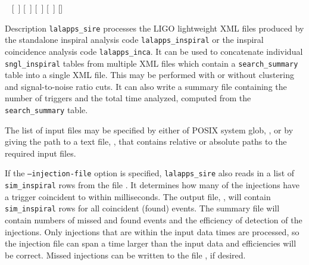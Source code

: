 \begin{entry}
~ \newline \hspace*{0.5in}
  \newline \hspace*{0.5in}
[~] \newline \hspace*{0.5in}
[~] \newline \hspace*{0.5in}
[~] \newline \hspace*{0.5in}
[~] \newline \hspace*{0.5in}
[] \newline \hspace*{0.5in}
 \newline \hspace*{0.5in}


\item[Description] 
\verb$lalapps_sire$ processes the LIGO lightweight XML files produced by the
standalone inspiral analysis code \verb$lalapps_inspiral$ or the inspiral
coincidence analysis code \verb$lalapps_inca$. It can be used to concatenate
individual \verb$sngl_inspiral$ tables from multiple XML files which contain a
\verb$search_summary$ table into a single XML file. This may be performed with
or without clustering and signal-to-noise ratio cuts. It can also write a
summary file containing the number of triggers and the total time analyzed,
computed from the \verb$search_summary$ table.

The list of input files may be specified by either of POSIX system glob,
, or by giving the path to a text file, ,
that contains relative or absolute paths to the required input files.

If the \texttt{--injection-file} option is specified, \verb$lalapps_sire$ also
reads in a list of \verb$sim_inspiral$ rows from the file .
It determines how many of the injections have a trigger coincident to within
 milliseconds. The output file, , will contain
\verb$sim_inspiral$ rows for all coincident (found) events. The summary file
will contain numbers of missed and found events and the efficiency of
detection of the injections.  Only injections that are within the input data
times are processed, so the injection file can span a time larger than the
input data and efficiencies will be correct. Missed injections can be written
to the file , if desired.


\end{entry}
